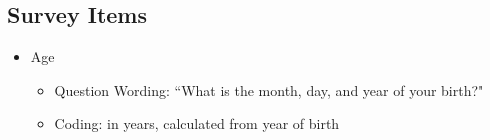 \subsection{Survey Items}\label{si:survey-items} %
\singlespacing

\begin{itemize}
	\item Age
		\begin{itemize}
			\item Question Wording: ``What is the month, day, and year of your birth?"
			\item Coding: in years, calculated from year of birth
		\end{itemize}
		

\end{itemize}
